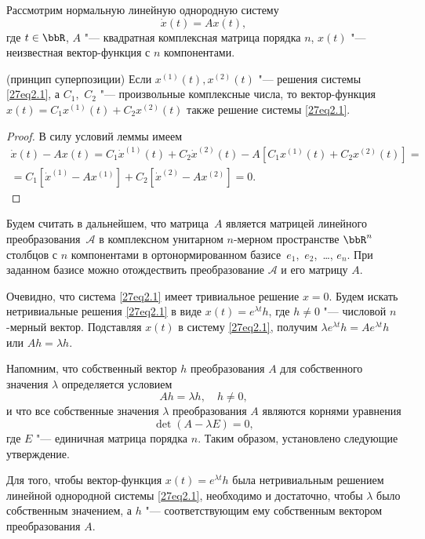 Рассмотрим нормальную линейную однородную систему
\begin{equation}\label{27eq2.1}
\dot x(t) = Ax(t),
\end{equation}
где $t\in\bbR$, $A$ "--- квадратная комплексная матрица порядка $n$, $x(t)$ "--- неизвестная вектор-функция с $n$ компонентами.

\begin{lemm}\label{27lemm1} (принцип суперпозиции)
Если $x^{(1)}(t), x^{(2)}(t)$ "--- решения системы \eqref{27eq2.1}, а  $C_1,$ $C_2$ "--- произвольные комплексные числа, то вектор-функция $x(t)=C_1x^{(1)}(t)+C_2x^{(2)}(t)$ также решение системы \eqref{27eq2.1}.
\end{lemm}
\begin{proof}
В силу условий леммы имеем
\begin{multline*}
\dot x(t)-Ax(t)=C_1\dot x^{(1)}(t)+C_2\dot{x}^{(2)}(t)-A\left[C_1{x}^{(1)}(t)+C_2{x}^{(2)}(t)\right]=\\=C_1\left[\dot{x}^{(1)}-Ax^{(1)}\right]+C_2\left[\dot{x}^{(2)}-Ax^{(2)}\right]=0.\tag*{\qedhere}
\end{multline*}
\end{proof}
Будем считать в дальнейшем, что матрица~$A$ является матрицей линейного преобразования~$\mathcal A$ в комплексном унитарном $n$-мерном пространстве $\bbR^n$ столбцов с $n$ компонентами в ортонормированном базисе~$e_1$,~$e_2$,~\dots, $e_n$. При заданном базисе можно отождествить преобразование $\mathcal A$ и его матрицу $A$.

Очевидно, что система \eqref{27eq2.1} имеет тривиальное решение $x=0$. Будем искать нетривиальные решения \eqref{27eq2.1} в виде $x(t)=e^{\lambda t}h$, где $h\neq 0$ "--- числовой $n$-мерный вектор. Подставляя $x(t)$ в систему \eqref{27eq2.1}, получим $\lambda e^{\lambda t}h=Ae^{\lambda t}h$ или $Ah=\lambda h$.

Напомним, что собственный вектор $h$ преобразования $A$ для собственного значения $\lambda$ определяется условием
$$
Ah=\lambda h,\quad h\neq 0,
$$
и что все собственные значения $\lambda$ преобразования $A$ являются корнями уравнения
$$
\det(A-\lambda E)=0,
$$
где $E$ "--- единичная матрица порядка $n$. Таким образом, установлено следующие утверждение.

\begin{lemm}\label{27lemm2}
Для того, чтобы вектор-функция $x(t)=e^{\lambda t}h$ была нетривиальным решением линейной однородной системы \eqref{27eq2.1}, необходимо и достаточно, чтобы $\lambda$ было собственным значением, а $h$ "--- соответствующим ему собственным вектором преобразования $A$.
\end{lemm}

